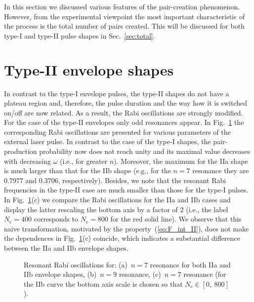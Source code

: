 \documentclass[preprint,aps,prd,showpacs,floatfix]{revtex4-1}
\begin{document}
\indent In this section we discussed various features of the pair-creation phenomenon. However, from the experimental viewpoint the most important characteristic of the process is the total number of pairs created. This will be discussed for both type-I and type-II pulse shapes in Sec.~\ref{sec:total}.
\section{Type-II envelope shapes}\label{sec:type-II}
In contrast to the type-I envelope pulses, the type-II shapes do not have a plateau region and, therefore, the pulse duration and the way how it is switched on/off are now related. As a result, the Rabi oscillations are strongly modified. For the case of the type-II envelopes only odd resonances appear. In Fig.~\ref{fig:rabi_II} the corresponding Rabi oscillations are presented for various parameters of the external laser pulse. In contrast to the case of the type-I shapes, the pair-production probability now does not reach unity and its maximal value decreases with decreasing $\omega$ (i.e., for greater $n$). Moreover, the maximum for the IIa shape is much larger than that for the IIb shape (e.g., for the $n=7$ resonance they are $0.7977$ and $0.3706$, respectively). Besides, we note that the resonant Rabi frequencies in the type-II case are much smaller than those for the type-I pulses. In Fig.~\ref{fig:rabi_II}(c) we compare the Rabi oscillations for the IIa and IIb cases and display the latter rescaling the bottom axis by a factor of $2$ (i.e., the label $N_\text{c} = 400$ corresponds to $N_\text{c} = 800$ for the red solid line). We observe that this naive transformation, motivated by the property~(\ref{eq:F_int_II}), does not make the dependences in Fig.~\ref{fig:rabi_II}(c) coincide, which indicates a substantial difference between the IIa and IIb envelope shapes.
%
\begin{figure}[h]
\caption{Resonant Rabi oscillations for: (a)~$n=7$ resonance for both IIa and IIb envelope shapes, (b)~$n=9$ resonance, (c)~$n=7$ resonance (for the IIb curve the bottom axis scale is chosen so that $N_\text{c} \in [0,~800]$).}
\label{fig:rabi_II}
\end{figure}
%
\end{document}
